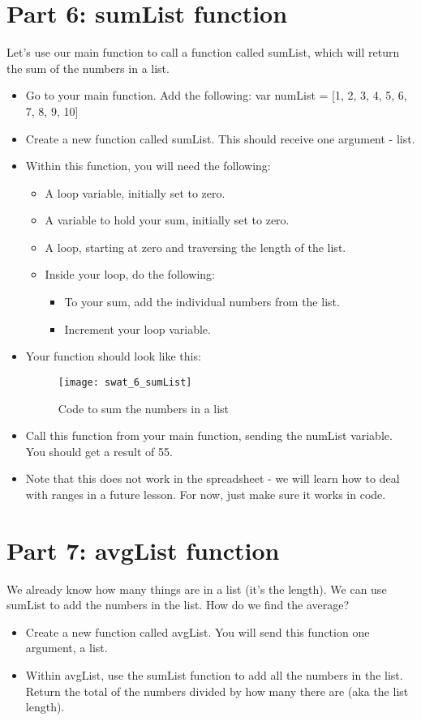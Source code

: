 \documentclass{article}
\begin{document}
\section*{Part 6: sumList function}
Let's use our main function to call a function called sumList, which will return the sum of the numbers in a list.
\begin{itemize}
	\item Go to your main function.  Add the following:  var numList = [1, 2, 3, 4, 5, 6, 7, 8, 9, 10]
	\item Create a new function called sumList.  This should receive one argument - list.
	\item Within this function, you will need the following:
	\begin{itemize}
		\item A loop variable, initially set to zero.
		\item A variable to hold your sum, initially set to zero.
		\item A loop, starting at zero and traversing the length of the list.
		\item Inside your loop, do the following:
		\begin{itemize}
			\item To your sum, add the individual numbers from the list.
			\item Increment your loop variable.
		\end{itemize}
	\end{itemize}
	\item Your function should look like this:
	\begin{figure}[H]
  		\centering
  		\texttt{[image: swat\_6\_sumList]}
  		\caption{Code to sum the numbers in a list}
	\end{figure}
	\item Call this function from your main function, sending the numList variable.  You should get a result of 55.
	\item Note that this does not work in the spreadsheet - we will learn how to deal with ranges in a future lesson.  For now, just make sure it works in code.
\end{itemize}

\section*{Part 7: avgList function}
We already know how many things are in a list (it's the length).  We can use sumList to add the numbers in the list.  How do we find the average?
\begin{itemize}
	\item Create a new function called avgList.  You will send this function one argument, a list.
	\item Within avgList, use the sumList function to add all the numbers in the list.  Return the total of the numbers divided by how many there are (aka the list length).
\end{itemize}
\end{document}
